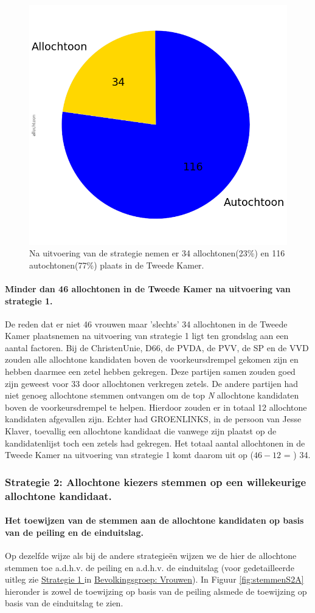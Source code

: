 \begin{figure}[H]
\centering
	\includegraphics[width=0.33\linewidth]{pie_chart_topN_allochtonen.png}

			\caption{Na uitvoering van de strategie nemen er 34 allochtonen(23\%) en 116 autochtonen(77\%) plaats in de Tweede Kamer.} 

\label{fig:pcS1A}
\end{figure}

\paragraph{Minder dan 46 allochtonen in de Tweede Kamer na uitvoering van strategie 1.}
De reden dat er niet 46 vrouwen maar 'slechts' 34 allochtonen in de Tweede Kamer plaatsnemen na uitvoering van strategie 1 ligt ten grondslag aan een aantal factoren. Bij de ChristenUnie, D66, de PVDA, de PVV, de SP en de VVD zouden alle allochtone kandidaten boven de voorkeursdrempel gekomen zijn en hebben daarmee een zetel hebben gekregen. Deze partijen samen zouden goed zijn geweest voor 33 door allochtonen verkregen zetels. De andere partijen had niet genoeg allochtone stemmen ontvangen om de top \textit{N} allochtone kandidaten boven de voorkeursdrempel te helpen. Hierdoor zouden er in totaal 12 allochtone kandidaten afgevallen zijn. Echter had GROENLINKS, in de persoon van Jesse Klaver, toevallig een allochtone kandidaat die vanwege zijn plaatst op de kandidatenlijst toch een zetels had gekregen.
Het totaal aantal allochtonen in de Tweede Kamer na uitvoering van strategie 1 komt daarom uit op ($46-12$ = ) 34. 


\subsubsection{Strategie 2: Allochtone kiezers stemmen op een willekeurige allochtone kandidaat.}





\paragraph{Het toewijzen van de stemmen aan de allochtone kandidaten op basis van de peiling en de einduitslag.}
Op dezelfde wijze als bij de andere strategie\"{e}n wijzen we de hier de allochtone stemmen toe a.d.h.v. de peiling en a.d.h.v. de einduitslag (voor gedetailleerde uitleg zie \hyperref[S1V]{Strategie 1 }in \hyperref[vrouwen]{Bevolkingsgroep: Vrouwen}). In Figuur \ref{fig:stemmenS2A} hieronder is zowel de toewijzing op basis van de peiling alsmede de toewijzing op basis van de einduitslag te zien.
 


